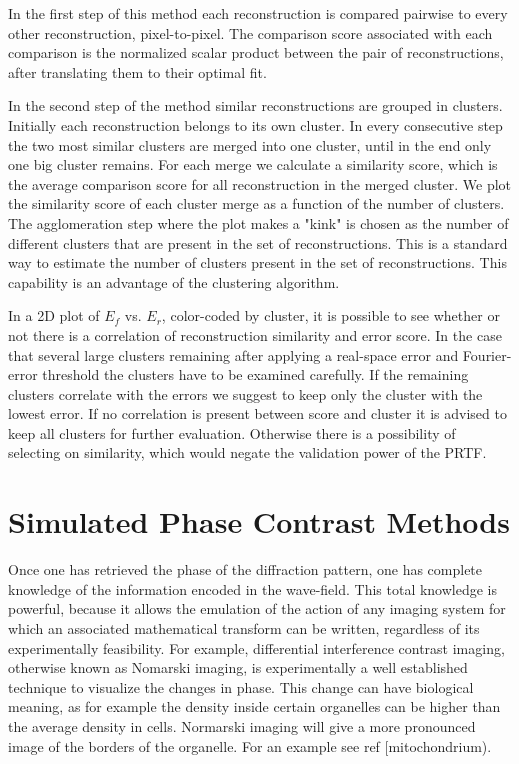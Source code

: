 In the first step of this method each reconstruction is compared pairwise to every other reconstruction, pixel-to-pixel. The comparison score associated with each comparison is the normalized scalar product between the pair of reconstructions, after translating them to their optimal fit. 

In the second step of the method similar reconstructions are grouped in clusters. Initially each reconstruction belongs to its own cluster. In every consecutive step the two most similar clusters are merged into one cluster, until in the end only one big cluster remains. For each merge we calculate a similarity score, which is the average comparison score for all reconstruction in the merged cluster. We plot the similarity score of each cluster merge as a function of the number of clusters. The agglomeration step where the plot makes a "kink" is chosen as the number of different clusters that are present in the set of reconstructions. This is a standard way to estimate the number of clusters present in the set of reconstructions. This capability is an advantage of the  clustering algorithm. 

In a 2D plot of $E_f$ vs. $E_r$, color-coded by cluster, it is possible to see whether or not there is a correlation of reconstruction similarity and error score.  In the case that several large clusters remaining after applying a real-space error and Fourier-error threshold the clusters have to be examined carefully. If the remaining clusters correlate with the errors we suggest to keep only the cluster with the lowest error. If no correlation is present between score and cluster it is advised to keep all clusters for further evaluation. Otherwise there is a possibility of selecting on similarity, which would negate the validation power of the PRTF.

 
\section{Simulated Phase Contrast Methods}
Once one has retrieved the phase of the diffraction pattern, one has complete knowledge of the information encoded in the  wave-field. This total knowledge is powerful, because it allows the emulation of the action of any imaging system for which an associated mathematical transform can be written, regardless of its experimentally feasibility.
For example, differential interference contrast imaging, otherwise known as Nomarski imaging, is experimentally a well established technique to visualize the changes in phase. This change can have biological meaning, as for example the density inside certain organelles can be higher than the average density in cells. Normarski imaging will give a more pronounced image of the borders of the organelle. For an example see ref [mitochondrium). 


